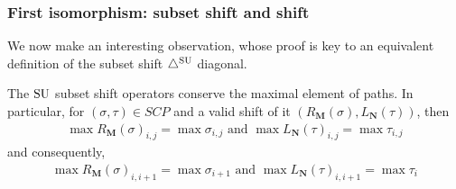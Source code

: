 


\subsubsection{First isomorphism: subset shift and shift}

We now make an interesting observation, whose proof is key to an equivalent definition of the subset shift $\triangle^{\mathrm{SU}}$ diagonal. 
\begin{lemma} \label{lem:SU subset conserves maximal element of paths}
The $\mathrm{SU}$ subset shift operators conserve the maximal element of paths.
In particular, for $(\sigma,\tau)\in SCP$ and a valid shift of it $(R_{\mathbf{M}}(\sigma),L_{\mathbf{N}}(\tau))$, then
\begin{align*}
    \max R_{\mathbf{M}}(\sigma)_{i,j} = \max \sigma_{i,j} \text{ and } \max L_{\mathbf{N}}(\tau)_{i,j} = \max \tau_{i,j}
\end{align*}
and consequently,
\begin{align*}
    \max R_{\mathbf{M}}(\sigma)_{i,i+1} = \max \sigma_{i+1} \text{ and } \max L_{\mathbf{N}}(\tau)_{i,i+1} = \max \tau_{i} 
\end{align*}
\end{lemma}

